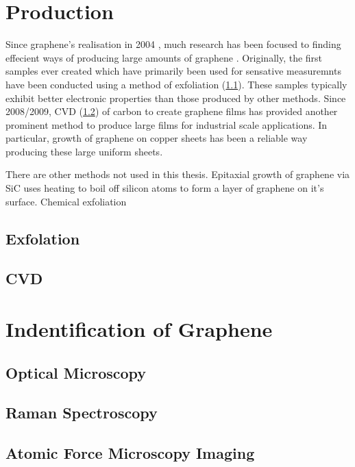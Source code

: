 \documentclass[../Matt_Gebert_Honours_Thesis.tex]{subfiles}
\begin{document}

\section{Production}

Since graphene's realisation in 2004 \cite{novoselov_electric_2004}, much research has been focused to finding effecient ways of producing large amounts of graphene \cite{zhang_review_2013}. Originally, the first samples ever created which have primarily been used for sensative measuremnts have been conducted using a method of exfoliation (\cref{sec:exfoliation}). These samples typically exhibit better electronic properties than those produced by other methods.
Since 2008/2009, CVD (\cref{sec:CVD}) of carbon to create graphene films has provided another prominent method to produce large films for industrial scale applications. In particular, growth of graphene on copper sheets \cite{li_large-area_2009} has been a reliable way producing these large uniform sheets.

There are other methods not used in this thesis. Epitaxial growth of graphene via SiC uses heating to boil off silicon atoms to form a layer of graphene on it's surface.
Chemical exfoliation 

\subsection{Exfolation}\label{sec:exfoliation}
\subsection{CVD}\label{sec:CVD}

\section{Indentification of Graphene}
\subsection{Optical Microscopy}

\subsection{Raman Spectroscopy}

\subsection{Atomic Force Microscopy Imaging}
\end{document}
